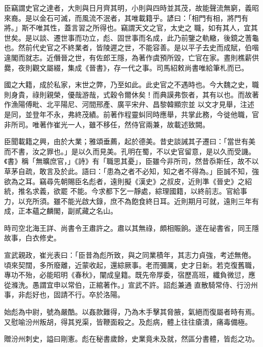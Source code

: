 \begin{pinyinscope}
 臣竊謂史官之達者，大則與日月齊其明，小則與四時並其茂，故能聲流無窮，義昭來裔。是以金石可滅，而風流不泯者，其唯載籍乎。諺曰：「相門有相，將門有將。」斯不唯其性，蓋言習之所得也。竊謂天文之官，太史之
 職，如有其人，宜其世矣。是以談、遷世事而功立，彪、固世事而名成，此乃前鑒之軌轍，後鏡之蓍龜也。然前代史官之不終業者，皆陵遲之世，不能容善。是以平子去史而成賦，伯喈違閣而就志。近僭晉之世，有佐郎王隱，為著作虞預所毀，亡官在家。晝則樵薪供爨，夜則觀文屬綴，集成《晉書》，存一代之事。司馬紹敕尚書唯給筆札而已。



 國之大籍，成於私家，末世之弊，乃至如此。此史官之不遇時也。今大魏之史，職則身貴，祿則親榮，優哉游哉，式穀令爾休矣！而典謨弗恢者，其有以也。而故著作漁陽傅毗、北平陽尼、河間邢產、廣平宋弁、昌黎韓顯宗並
 以文才見舉，注述是同，並登年不永，弗終茂績。前著作程靈虯同時應舉，共掌此務，今徙他職，官非所司。唯著作崔光一人，雖不移任，然侍官兩兼，故載述致闕。



 臣聞載籍之興，由於大業；雅頌垂薦，起於德美。昔史談誡其子遷曰：「當世有美而不書，汝之罪也。」是以久而見美。孔明在蜀，不以史官留意，是以久而受譏。《書》稱「無曠庶官，」《詩》有「職思其憂」，臣雖今非所司，然昔忝斯任，故不以草茅自疏，敢言及於此。語曰：「患為之者不必知，知之者不得為。」臣誠不知，強欲為之耳。竊尋先朝賜臣名彪者，遠則擬《漢史》之叔皮，近則準《晉史》之紹統，推名求義，欲罷
 不能。今求都下乞一靜處，綜理國籍，以終前志。官給事力，以充所須。雖不能光啟大錄，庶不為飽食終日耳。近則期月可就，遠則三年有成，正本蘊之麟閣，副貳藏之名山。



 時司空北海王詳、尚書令王肅許之。肅以其無祿，頗相賑餉。遂在祕書省，同王隱故事，白衣修史。



 宣武親政，崔光表曰：「臣昔為彪所致，與之同業積年，其志力貞強，考述無倦。頃來契闊，多所廢離，近蒙收起，還綜厥事。老而彌厲，史才日新。若克復舊職，專功不殆，必能昭明《春秋》，闡成皇籍。既先帝厚委，宿歷高班，纖負微愆，應從滌洗。愚謂宜申以常伯，正綰著作。」宣武不許。詔彪兼通
 直散騎常侍、行汾州事，非彪好也，固請不行。卒於洛陽。



 始彪為中尉，號為嚴酷。以姦款難得，乃為木手擊其脅腋，氣絕而復屬者時有焉。又慰喻汾州叛胡，得其兇渠，皆鞭面殺之。及彪病，體上往往瘡潰，痛毒備極。



 贈汾州刺史，謚曰剛憲。彪在秘書歲餘，史業竟未及就，然區分書體，皆彪之功。




\end{pinyinscope}
